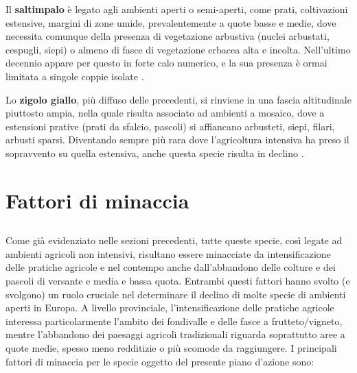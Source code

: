 \documentclass[10pt,twoside,openany,x11names,svgnames,italian,a5paper,dvipsnames,table]{memoir}
\newcommand\chapterillustration{}
\begin{document}
Il \textbf{saltimpalo} è legato agli ambienti aperti o semi-aperti, come prati, coltivazioni estensive, margini di zone umide, prevalentemente a quote basse e medie, dove necessita comunque della presenza di vegetazione arbustiva (nuclei arbustati, cespugli, siepi) o almeno di fasce di vegetazione erbacea alta e incolta. Nell’ultimo decennio appare per questo in forte calo numerico, e la sua presenza è ormai limitata a singole coppie isolate \cite{Pedrini05}.


Lo \textbf{zigolo giallo}, più diffuso delle precedenti, si rinviene in una fascia altitudinale piuttosto ampia, nella quale risulta associato ad ambienti a mosaico, dove a estensioni prative (prati da sfalcio, pascoli) si affiancano arbusteti, siepi, filari, arbusti sparsi. Diventando sempre più rara dove l'agricoltura intensiva  ha preso il sopravvento su quella estensiva, anche questa specie risulta in declino \cite{Pedrini05}.

\newpage
\chapter{Fattori di minaccia}
\renewcommand\chapterillustration{5.JPG}
\section*{}
Come già evidenziato nelle sezioni precedenti, tutte queste specie, così legate ad ambienti agricoli non intensivi, risultano essere minacciate da intensificazione delle pratiche agricole e nel contempo anche dall’abbandono delle colture e dei pascoli di versante e media e bassa quota. Entrambi questi fattori hanno svolto (e svolgono) un ruolo cruciale nel determinare il declino di molte specie di ambienti aperti in Europa. 
A livello provinciale, l'intensificazione delle pratiche agricole interessa particolarmente l’ambito dei fondivalle e delle fasce a frutteto/vigneto, mentre l'abbandono dei paesaggi agricoli tradizionali riguarda soprattutto aree a quote medie, spesso meno redditizie o più scomode da raggiungere. 
I principali fattori di minaccia per le specie oggetto del presente piano d'azione sono:
\end{document}
